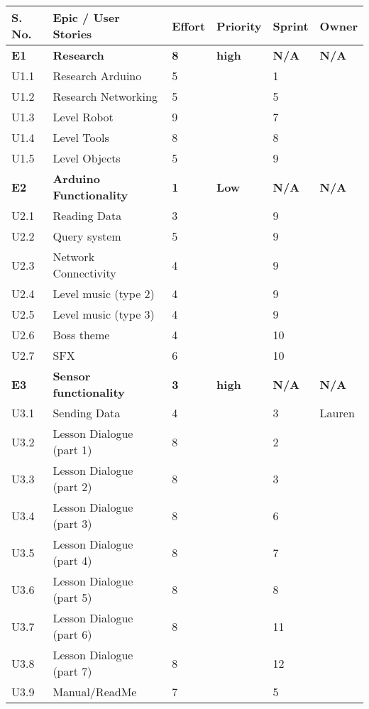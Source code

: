 \begin{longtable}[h!]{|p{1cm}|p{8.6cm}|p{1cm}|p{1.2cm}|p{1.2cm}|p{1.3cm}|}
    \hline
    S. No. & Epic / User Stories & Effort & Priority & Sprint & Owner \\ 
    \hline
    \midrule
	\textbf{E1}   & \textbf{Research} & \textbf{8} & \textbf{high} & \textbf{N/A} & \textbf{N/A}\\
    \hline
    U1.1  & Research Arduino   & 5 & & 1 & \\
    \hline
    U1.2  & Research Networking   & 5 & & 5 & \\
    \hline
    U1.3  & Level Robot        & 9 & & 7 & \\
    \hline
    U1.4  & Level Tools        & 8 & & 8 & \\
    \hline
    U1.5  & Level Objects      & 5 & & 9 & \\
    \hline
	\midrule
    \textbf{E2}   & \textbf{Arduino Functionality}   &  \textbf{1}  & \textbf{Low} & \textbf{N/A} & \textbf{N/A}   \\ 
    \hline
    U2.1 & Reading Data           & 3 & & 9 & \\
    \hline
    U2.2 & Query system      & 5 & & 9 & \\
    \hline
    U2.3 & Network Connectivity & 4 & & 9 & \\
    \hline
    U2.4 & Level music (type 2) & 4 & & 9 & \\
    \hline
    U2.5 & Level music (type 3) & 4 & & 9 & \\
    \hline
    U2.6 & Boss theme           & 4 & & 10 & \\
    \hline
    U2.7 & SFX                  & 6 & & 10 & \\
    \hline
	\midrule
	\textbf{E3}   & \textbf{Sensor functionality } & \textbf{3} & \textbf{high} & \textbf{N/A} & \textbf{N/A}\\
    \hline
    U3.1 & Sending Data    & 4 & & 3 & Lauren\\
    \hline
    U3.2 & Lesson Dialogue (part 1) & 8 & & 2 & \\
    \hline
    U3.3 & Lesson Dialogue (part 2) & 8 & & 3 & \\
    \hline
    U3.4 & Lesson Dialogue (part 3) & 8 & & 6 & \\
    \hline
    U3.5 & Lesson Dialogue (part 4) & 8 & & 7 & \\
    \hline
    U3.6 & Lesson Dialogue (part 5) & 8 & & 8 & \\
    \hline
    U3.7 & Lesson Dialogue (part 6) & 8 & & 11 & \\
    \hline
    U3.8 & Lesson Dialogue (part 7) & 8 & & 12 & \\
    \hline
    U3.9 & Manual/ReadMe   & 7 & & 5 & \\
    \hline
    

\end{longtable}
